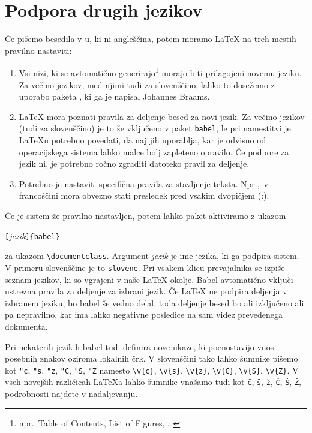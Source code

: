 \section{Podpora drugih jezikov}
Če pišemo besedila v u, ki ni angleščina, potem 
moramo \LaTeX{} na treh mestih pravilno nastaviti:

\begin{enumerate}
\item Vsi nizi, ki se avtomatično generirajo\footnote{npr.~Table of
    Contents, List of Figures, \ldots} morajo biti prilagojeni novemu jeziku. Za večino jezikov,
    med njimi tudi za slovenščino, lahko to dosežemo z uporabo paketa , ki ga je napisal Johannes Braams.
\item \LaTeX{} mora poznati pravila za deljenje besed za novi jezik. Za večino jezikov (tudi za slovenščino) je to
  že vključeno v paket \texttt{babel}, le pri namestitvi je \LaTeX{}u potrebno povedati, da naj jih uporablja, kar
  je odvisno od operacijskega sistema lahko malce bolj zapleteno opravilo. Če podpore za jezik ni, 
  je potrebno ročno zgraditi datoteko pravil za deljenje. 
\item Potrebno je nastaviti specifična pravila za stavljenje teksta. 
Npr.,~v francoščini mora obvezno stati presledek pred vsakim dvopičjem (:).
\end{enumerate}

Če je sistem že pravilno nastavljen, potem lahko paket 
 aktiviramo z ukazom
\begin{lscommand}
\verb|[|\emph{jezik}\verb|]{babel}| 
\end{lscommand}
\noindent za ukazom \verb|\documentclass|. Argument \emph{jezik} je ime jezika,
ki ga podpira sistem. V primeru slovenščine je to \texttt{slovene}. 
Pri vsakem klicu prevajalnika se izpiše seznam jezikov, ki so vgrajeni v naše
\LaTeX{} okolje.
Babel 
avtomatično vključi ustrezna pravila za deljenje za izbrani jezik. Če \LaTeX{} ne podpira
deljenja v izbranem jeziku, bo \textsf{babel} še vedno delal, toda deljenje besed bo ali izključeno ali pa nepravilno, kar ima lahko negativne posledice
na sam videz prevedenega dokumenta.

Pri nekaterih jezikih \textsf{babel} tudi definira nove ukaze, ki poenostavijo vnos posebnih znakov
oziroma lokalnih črk. V slovenščini tako lahko šumnike pišemo 
kot \verb|"c|, \verb|"s|, \verb|"z|, \verb|"C|, \verb|"S|, \verb|"Z| 
namesto
\verb|\v{c}|, \verb|\v{s}|, \verb|\v{z}|, \verb|\v{C}|, \verb|\v{S}|, \verb|\v{Z}|.
V vseh novejših različicah \LaTeX{}a lahko šumnike vnašamo 
tudi kot \verb|č|, \verb|š|, \verb|ž|, \verb|Č|, \verb|Š|, \verb|Ž|,
podrobnosti najdete v nadaljevanju.

